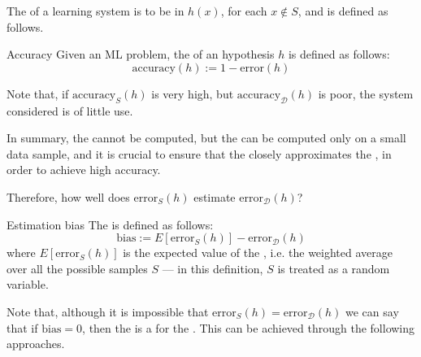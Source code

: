 \documentclass[a4paper, 12pt]{report}
\begin{document}
    The  of a learning system is to be  in $h(x)$, for each $x \notin S$, and  is defined as follows.

    \begin{frameddefn}{Accuracy}
        Given an ML problem, the  of an hypothesis $h$ is defined as follows: $$\mathrm{accuracy}(h) := 1 - \mathrm{error}(h)$$
    \end{frameddefn}

    Note that, if $\mathrm{accuracy}_S(h)$ is very high, but $\mathrm{accuracy}_\mathcal D(h)$ is poor, the system considered is of little use.

    In summary, the  cannot be computed, but the  can be computed only on a small data sample, and it is crucial to ensure that the  closely approximates the , in order to achieve high accuracy.

    Therefore, how well does $\mathrm{error}_S(h)$ estimate $\mathrm{error}_\mathcal D(h)$?

    \begin{frameddefn}{Estimation bias}
        The  is defined as follows: $$\mathrm{bias} := E[\mathrm{error}_S(h)] - \mathrm{error}_\mathcal D(h)$$ where $E[\mathrm{error}_S(h)]$ is the expected value of the , i.e. the weighted average over all the possible samples $S$ --- in this definition, $S$ is treated as a random variable.
    \end{frameddefn}

    Note that, although it is impossible that $\mathrm{error}_S(h) = \mathrm{error}_\mathcal D(h)$ we can say that if $\mathrm{bias} = 0$, then the  is a  for the . This can be achieved through the following approaches.
\end{document}
